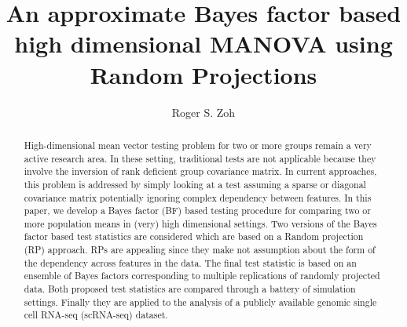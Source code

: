 \documentclass[12pt]{article}
\title{An approximate Bayes factor based high dimensional MANOVA using Random Projections}
\author{Roger S. Zoh}
\begin{document}
	\maketitle

\begin{abstract}
High-dimensional mean vector testing problem for two or more groups remain a very active research area. In these setting, traditional tests are not applicable because they involve the inversion of rank deficient group covariance matrix. In current approaches, this problem is addressed by simply looking at a test assuming a sparse or diagonal covariance matrix potentially ignoring complex dependency between features.
In this paper, we develop a Bayes factor (BF) based testing procedure for comparing two or more population means in (very) high dimensional settings. Two versions of the Bayes factor based test statistics are considered which are based on a Random projection (RP) approach. RPs are appealing since they make not assumption about the form of the dependency across features in the data. The final test statistic is based on an ensemble of Bayes factors corresponding to multiple replications of randomly projected data. Both proposed test statistics are compared through a battery of simulation settings. Finally they are applied to the analysis of a publicly available genomic single cell RNA-seq (scRNA-seq) dataset. 

\end{abstract}
\end{document}
